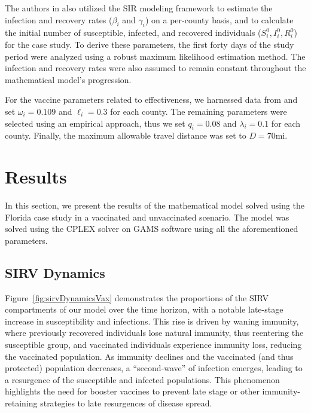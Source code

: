 \documentclass{article}
\begin{document}
The authors in \textcite{abazari2024allocation} also utilized the SIR modeling framework to estimate the infection and recovery rates ($\beta_i$ and $\gamma_i$) on a per-county basis, and to calculate the initial number of susceptible, infected, and recovered individuals ($S_i^0, I_i^0, R_i^0$) for the case study. To derive these parameters, the first forty days of the study period were analyzed using a robust maximum likelihood estimation method. The infection and recovery rates were also assumed to remain constant throughout the mathematical model's progression.

For the vaccine parameters related to effectiveness, we harnessed data from \textcite{zheng2022real} and set $\omega_i = 0.109$ and $\ell_i = 0.3$ for each county. The remaining parameters were selected using an empirical approach, thus we set $q_i = 0.08$ and $\lambda_i = 0.1$ for each county. Finally, the maximum allowable travel distance was set to $D=70$mi.



\section{Results}
In this section, we present the results of the mathematical model solved using the Florida case study in a vaccinated and unvaccinated scenario. The model was solved using the CPLEX solver on GAMS software using all the aforementioned parameters. 

\subsection{SIRV Dynamics}
Figure~\ref{fig:sirvDynamicsVax} demonstrates the proportions of the SIRV compartments of our model over the time horizon, with a notable late-stage increase in susceptibility and infections. This rise is driven by waning immunity, where previously recovered individuals lose natural immunity, thus reentering the susceptible group, and vaccinated individuals experience immunity loss, reducing the vaccinated population. As immunity declines and the vaccinated (and thus protected) population decreases, a ``second-wave'' of infection emerges, leading to a resurgence of the susceptible and infected populations. This phenomenon highlights the need for booster vaccines to prevent late stage or other immunity-retaining strategies to late resurgences of disease spread.
\end{document}
